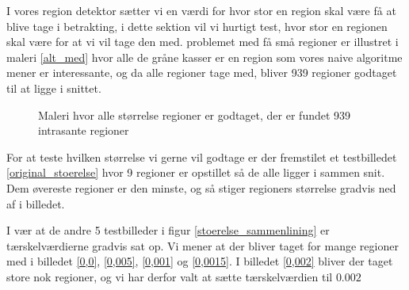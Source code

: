 {\sffamily
I vores region detektor sætter vi en værdi for hvor stor en region skal
være få at blive tage i betrakting, i dette sektion vil vi hurtigt test,
hvor stor en regionen skal være for at vi vil tage den med. problemet
med få små regioner er illustret i maleri \ref{alt_med} hvor alle de
gråne kasser er en region som vores naive algoritme mener er
interessante, og da alle regioner tage med, bliver 939 regioner godtaget
til at ligge i snittet. 
}

\begin{figure}[¡h]
    \setlength\fboxsep{0pt}
    \setlength\fboxrule{0.5pt}
    \begin{center}
    \end{center}
    \caption{Maleri hvor alle størrelse regioner er godtaget, der er fundet 939 intrasante regioner}
\end{figure}
For at teste hvilken størrelse vi gerne vil godtage er der fremstilet et
testbilledet \ref{original_stoerelse} hvor 9 regioner er opstillet så de
alle ligger i sammen snit. Dem øvereste regioner er den minste, og så
stiger regioners størrelse gradvis ned af i billedet.

I vær at de andre 5 testbilleder i figur \ref{stoerelse_sammenlining} er
tærskelværdierne gradvis sat op. Vi mener at der bliver taget for mange
regioner med i billedet \ref{0,0}, \ref{0,005}, \ref{0,001} og
\ref{0,0015}. I billedet \ref{0,002} bliver der taget store nok
regioner, og vi har derfor valt at sætte tærskelværdien til $0.002$
 
